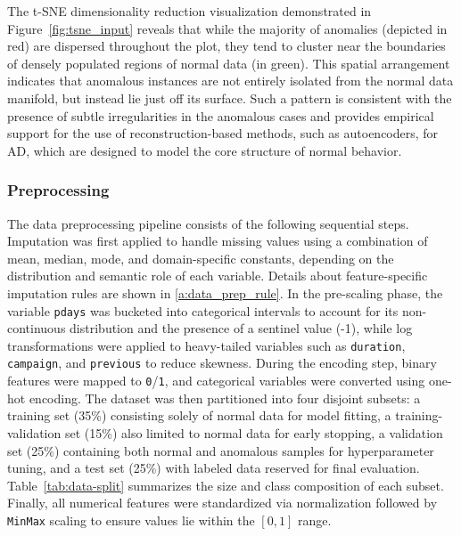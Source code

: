

The t-SNE dimensionality reduction visualization demonstrated in Figure~\ref{fig:tsne_input} reveals that while the majority of anomalies (depicted in red) are dispersed throughout the plot, they tend to cluster near the boundaries of densely populated regions of normal data (in green). This spatial arrangement indicates that anomalous instances are not entirely isolated from the normal data manifold, but instead lie just off its surface. Such a pattern is consistent with the presence of subtle irregularities in the anomalous cases and provides empirical support for the use of reconstruction-based methods, such as autoencoders, for AD, which are designed to model the core structure of normal behavior.

\subsubsection{Preprocessing}

The data preprocessing pipeline consists of the following sequential steps. Imputation was first applied to handle missing values using a combination of mean, median, mode, and domain-specific constants, depending on the distribution and semantic role of each variable. Details about feature-specific imputation rules are shown in \ref{a:data_prep_rule}. In the pre-scaling phase, the variable \texttt{pdays} was bucketed into categorical intervals to account for its non-continuous distribution and the presence of a sentinel value (-1), while log transformations were applied to heavy-tailed variables such as \texttt{duration}, \texttt{campaign}, and \texttt{previous} to reduce skewness. During the encoding step, binary features were mapped to \texttt{0}/\texttt{1}, and categorical variables were converted using one-hot encoding. The dataset was then partitioned into four disjoint subsets: a training set (35\%) consisting solely of normal data for model fitting, a training-validation set (15\%) also limited to normal data for early stopping, a validation set (25\%) containing both normal and anomalous samples for hyperparameter tuning, and a test set (25\%) with labeled data reserved for final evaluation. Table~\ref{tab:data-split} summarizes the size and class composition of each subset. Finally, all numerical features were standardized via normalization followed by \texttt{MinMax} scaling to ensure values lie within the $[0, 1]$ range.



